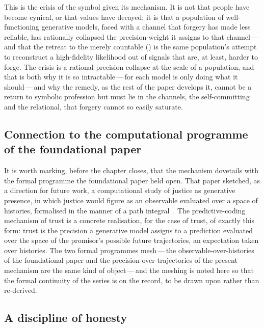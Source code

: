 This is the crisis of the symbol given its mechanism. It is not that people have become cynical, or that values have decayed; it is that a population of well-functioning generative models, faced with a channel that forgery has made less reliable, has rationally collapsed the precision-weight it assigns to that channel\,---\,and that the retreat to the merely countable () is the same population's attempt to reconstruct a high-fidelity likelihood out of signals that are, at least, harder to forge. The crisis is a rational precision collapse at the scale of a population, and that is both why it is so intractable\,---\,for each model is only doing what it should\,---\,and why the remedy, as the rest of the paper develops it, cannot be a return to symbolic profession but must lie in the channels, the self-committing and the relational, that forgery cannot so easily saturate.

\subsection{Connection to the computational programme of the foundational paper}
\label{p13:sub:mech-Jbracket}

It is worth marking, before the chapter closes, that the mechanism dovetails with the formal programme the foundational paper held open. That paper sketched, as a direction for future work, a computational study of justice as generative presence, in which justice would figure as an observable evaluated over a space of histories, formalised in the manner of a path integral~\parencite{wanhong_grb}. The predictive-coding mechanism of trust is a concrete realisation, for the case of trust, of exactly this form: trust is the precision a generative model assigns to a prediction evaluated over the space of the promisor's possible future trajectories, an expectation taken over histories. The two formal programmes mesh\,---\,the observable-over-histories of the foundational paper and the precision-over-trajectories of the present mechanism are the same kind of object\,---\,and the meshing is noted here so that the formal continuity of the series is on the record, to be drawn upon rather than re-derived.

\subsection{A discipline of honesty}
\label{p13:sub:mech-honesty}

